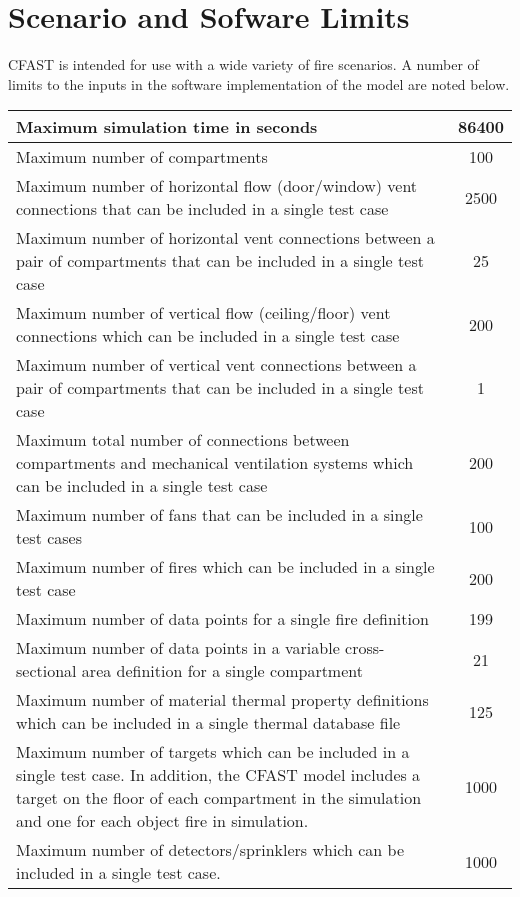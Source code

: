 \chapter{Scenario and Sofware Limits}

CFAST is intended for use with a wide variety of fire scenarios.  A number of limits to the inputs in the software implementation of the model are noted below.


\begin{center}
\begin{tabular}{|p{15cm}|c|}
\hline
Maximum simulation time in seconds & 86400 \\ \hline
Maximum number of compartments & 100 \\ \hline
Maximum number of horizontal flow (door/window) vent connections that can be included in a single test case & 2500 \\ \hline
Maximum number of horizontal vent connections between a pair of compartments that can be included in a single test case & 25 \\ \hline
Maximum number of vertical flow (ceiling/floor) vent connections which can be included in a single test case & 200 \\ \hline
Maximum number of vertical vent connections between a pair of compartments that can be included in a single test case & 1 \\ \hline
Maximum total number of connections between compartments and mechanical ventilation systems which can be included in a single test case & 200 \\ \hline
Maximum number of fans that can be included in a single test cases  & 100 \\ \hline

Maximum number of fires which can be included in a single test case & 200 \\ \hline
Maximum number of data points for a single  fire definition & 199 \\ \hline
Maximum number of data points in a variable cross-sectional area definition for a single compartment & 21 \\ \hline
Maximum number of material thermal property definitions which can be included in a single thermal database file & 125 \\ \hline

Maximum number of targets which can be included in a single test case. In addition, the CFAST model includes a target on the floor of each compartment in the simulation and one for each object fire in simulation. & 1000 \\ \hline
Maximum number of detectors/sprinklers which can be included in a single test case. & 1000 \\ \hline

\hline
\end{tabular}
\end{center} 